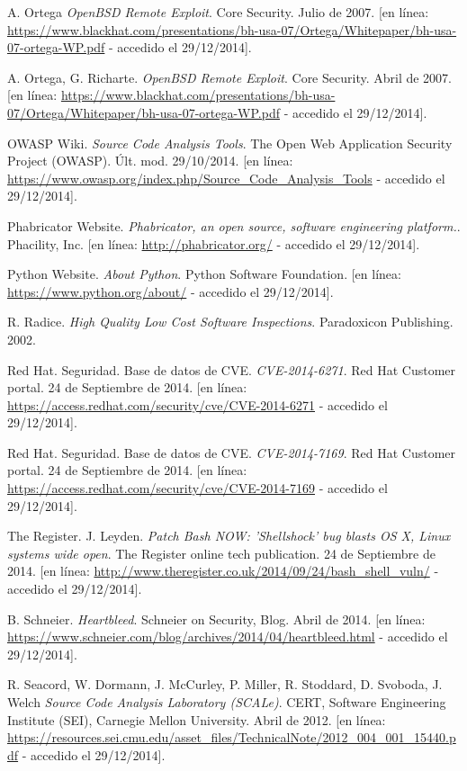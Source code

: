\documentclass[11pt,a4paper]{article}
\begin{document}
\begin{thebibliography}{99}
	A. Ortega
	\emph{OpenBSD Remote Exploit}.
	Core Security. 
	Julio de 2007. 
	[en línea: \url{https://www.blackhat.com/presentations/bh-usa-07/Ortega/Whitepaper/bh-usa-07-ortega-WP.pdf} - accedido el 29/12/2014].

	A. Ortega, G. Richarte.
	\emph{OpenBSD Remote Exploit}.
	Core Security. 
	Abril de 2007. 
	[en línea: \url{https://www.blackhat.com/presentations/bh-usa-07/Ortega/Whitepaper/bh-usa-07-ortega-WP.pdf} - accedido el 29/12/2014].

	OWASP Wiki.
	\emph{Source Code Analysis Tools}.
	The Open Web Application Security Project (OWASP).
	Últ. mod. 29/10/2014. 
	[en línea: \url{https://www.owasp.org/index.php/Source_Code_Analysis_Tools} - accedido el 29/12/2014].

	Phabricator Website.
	\emph{Phabricator, an open source, software engineering platform.}.
	Phacility, Inc.
	[en línea: \url{http://phabricator.org/} - accedido el 29/12/2014].

	Python Website.
	\emph{About Python}.
	Python Software Foundation.
	[en línea: \url{https://www.python.org/about/} - accedido el 29/12/2014].

	R. Radice.
	\emph{High Quality Low Cost Software Inspections}.
	Paradoxicon Publishing.
	2002.

	Red Hat. Seguridad. Base de datos de CVE.
	\emph{CVE-2014-6271}.
	Red Hat Customer portal.
	24 de Septiembre de 2014.
	[en línea: \url{https://access.redhat.com/security/cve/CVE-2014-6271} - accedido el 29/12/2014].

	Red Hat. Seguridad. Base de datos de CVE.
	\emph{CVE-2014-7169}.
	Red Hat Customer portal.
	24 de Septiembre de 2014.
	[en línea: \url{https://access.redhat.com/security/cve/CVE-2014-7169} - accedido el 29/12/2014].

	The Register. J. Leyden.
	\emph{Patch Bash NOW: 'Shellshock' bug blasts OS X, Linux systems wide open}.
	The Register online tech publication.
	24 de Septiembre de 2014.
	[en línea: \url{http://www.theregister.co.uk/2014/09/24/bash_shell_vuln/} - accedido el 29/12/2014].
	
	 B. Schneier.
	 \emph{Heartbleed}.
	 Schneier on Security, Blog.
	 Abril de 2014.
	 [en línea: \url{https://www.schneier.com/blog/archives/2014/04/heartbleed.html} - accedido el 29/12/2014].

	R. Seacord, W. Dormann, J. McCurley, P. Miller, R. Stoddard, D. Svoboda, J. Welch
	\emph{Source Code Analysis Laboratory (SCALe)}.
	CERT, Software Engineering Institute (SEI), Carnegie Mellon University.
	Abril de 2012.
	[en línea: \url{https://resources.sei.cmu.edu/asset_files/TechnicalNote/2012_004_001_15440.pdf} - accedido el 29/12/2014].


\end{thebibliography}
\end{document}
